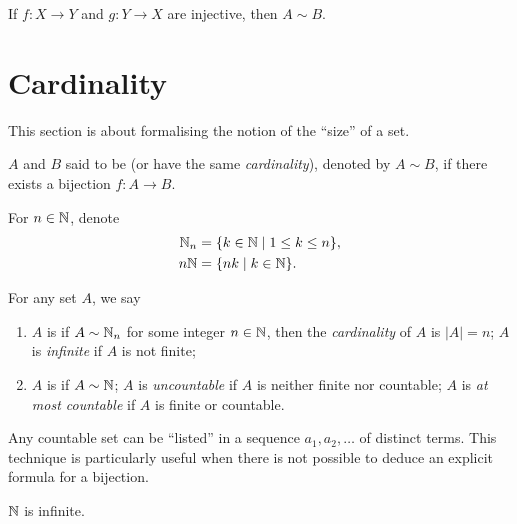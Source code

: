 \begin{theorem}
If $f\colon X\to Y$ and $g\colon Y\to X$ are injective, then $A\sim B$.
\end{theorem}
\pagebreak

\section{Cardinality}
This section is about formalising the notion of the ``size'' of a set.

\begin{definition}
$A$ and $B$ said to be  (or have the same \emph{cardinality}), denoted by $A\sim B$, if there exists a bijection $f\colon A\to B$. 
\end{definition}

\begin{notation}
For $n\in\mathbb N$, denote
\begin{align*}
\mathbb N_n&=\{k\in\mathbb N\mid 1\le k\le n\},\\
n\mathbb N&=\{nk\mid k\in\mathbb N\}.
\end{align*}
\end{notation}

\begin{definition}
For any set $A$, we say
\begin{enumerate}[label=(\roman*)]
\item $A$ is  if $A\sim\mathbb N_n$ for some integer $n\in\mathbb N$, then the \emph{cardinality} of $A$ is $|A|=n$; $A$ is \emph{infinite} if $A$ is not finite;
\item $A$ is  if $A\sim\mathbb N$; $A$ is \emph{uncountable} if $A$ is neither finite nor countable; $A$ is \emph{at most countable} if $A$ is finite or countable.
\end{enumerate}
\end{definition}

\begin{remark}
Any countable set can be ``listed'' in a sequence $a_1,a_2,\dots$ of distinct terms. This technique is particularly useful when there is not possible to deduce an explicit formula for a bijection.
\end{remark}

\begin{lemma}
$\mathbb N$ is infinite.
\end{lemma}

